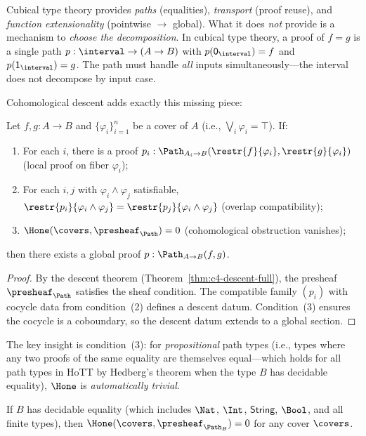 Cubical type theory provides \emph{paths} (equalities), \emph{transport}
(proof reuse), and \emph{function extensionality} (pointwise $\to$ global).
What it does \emph{not} provide is a mechanism to \emph{choose the
decomposition}.  In cubical type theory, a proof of $f = g$ is a single
path $p : \interval \to (A \to B)$ with $p(\mathsf{0}_\interval) = f$
and $p(\mathsf{1}_\interval) = g$.  The path must handle \emph{all}
inputs simultaneously---the interval does not decompose by input case.

Cohomological descent adds exactly this missing piece:

\begin{theorem}
\label{thm:decomposition}
Let $f, g : A \to B$ and $\{\varphi_i\}_{i=1}^n$ be a cover of
$A$ (i.e., $\bigvee_i \varphi_i = \top$).  If:
\begin{enumerate}
\item For each $i$, there is a proof $p_i : \Path_{A_i \to B}
  (\restr{f}{\varphi_i}, \restr{g}{\varphi_i})$
  (local proof on fiber $\varphi_i$);
\item For each $i, j$ with $\varphi_i \wedge \varphi_j$ satisfiable,
  $\restr{p_i}{\varphi_i \wedge \varphi_j} =
  \restr{p_j}{\varphi_i \wedge \varphi_j}$
  (overlap compatibility);
\item $\Hone(\covers, \presheaf_{\Path}) = 0$ (cohomological obstruction
  vanishes);
\end{enumerate}
then there exists a global proof $p : \Path_{A \to B}(f, g)$.
\end{theorem}

\begin{proof}
By the descent theorem (Theorem~\ref{thm:c4-descent-full}), the
presheaf $\presheaf_\Path$ satisfies the sheaf condition.  The
compatible family $(p_i)$ with cocycle data from condition~(2)
defines a descent datum.  Condition~(3) ensures the cocycle is
a coboundary, so the descent datum extends to a global section.
\end{proof}

The key insight is condition~(3): for \emph{propositional} path types
(i.e., types where any two proofs of the same equality are themselves
equal---which holds for all path types in HoTT by Hedberg's theorem
when the type $B$ has decidable equality), $\Hone$ is \emph{automatically
trivial}.

\begin{proposition}[$\Hone = 0$ for Path Types over Decidable Types]
\label{prop:h1-trivial}
If $B$ has decidable equality (which includes $\Nat$, $\Int$,
$\mathsf{String}$, $\Bool$, and all finite types), then
$\Hone(\covers, \presheaf_{\Path_B}) = 0$ for any cover $\covers$.
\end{proposition}

